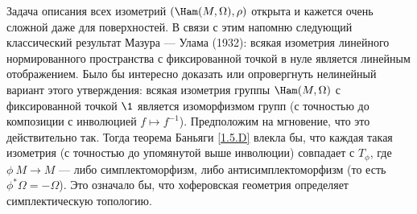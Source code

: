 Задача описания всех изометрий $(\Ham(M,\Omega), \rho)$ открыта и
кажется очень сложной даже для поверхностей. 
В связи с этим напомню следующий классический результат Мазура --- Улама \cite{MU} (1932): всякая
изометрия линейного нормированного пространства с фиксированной точкой
в нуле является линейным отображением. 
Было бы интересно доказать или опровергнуть нелинейный вариант этого
утверждения: всякая изометрия группы $\Ham(M,\Omega)$ с фиксированной
точкой $\1$ является изоморфизмом групп (с точностью до композиции с
инволюцией $f\mapsto f^{-1}$). 
Предположим на мгновение, что это действительно так.
Тогда теорема Баньяги \ref{1.5.D} влекла бы, что
каждая такая изометрия (с точностью до упомянутой выше инволюции)
совпадает с $T_\phi$, где $\phi\: M \to M$ --- либо симплектоморфизм,
либо антисимплектоморфизм (то есть $\phi^\ast\Omega = -\Omega$).
Это означало бы, что хоферовская геометрия определяет симплектическую топологию.
